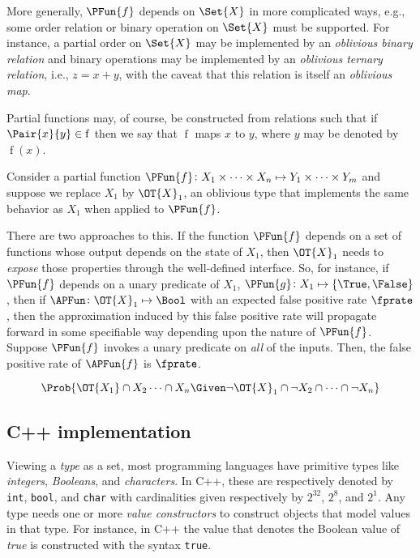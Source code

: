\documentclass[ ../main.tex]{subfiles}
\begin{document}
	More generally, $\PFun{f}$ depends on $\Set{X}$ in more complicated ways, e.g., some order relation or binary operation on $\Set{X}$ must be supported.
	For instance, a partial order on $\Set{X}$ may be implemented by an \emph{oblivious binary relation} and binary operations may be implemented by an \emph{oblivious ternary relation}, i.e., $z=x+y$, with the caveat that this relation is itself an \emph{oblivious map}.
	
	Partial functions may, of course, be constructed from relations such that if $\Pair{x}{y} \in \operatorname{f}$ then we say that $\operatorname{f}$ maps $x$ to $y$, where $y$ may be denoted by $\operatorname{f}(x)$.
	
Consider a partial function $\PFun{f} \colon X_1 \times \cdots \times X_n \mapsto Y_1 \times \cdots \times Y_m$ and suppose we replace $X_1$ by $\OT{X}_1$, an oblivious type that implements the same behavior as $X_1$ when applied to $\PFun{f}$.
	
	There are two approaches to this.
	If the function $\PFun{f}$ depends on a set of functions whose output depends on the state of $X_1$, then $\OT{X}_1$ needs to \emph{expose} those properties through the well-defined interface.
	So, for instance, if $\PFun{f}$ depends on a unary predicate of $X_1$, $\PFun{g} \colon X_1 \mapsto \{\True,\False\}$, then if $\APFun \colon \OT{X}_1 \mapsto \Bool$ with an expected false positive rate $\fprate$, then the approximation induced by this false positive rate will propagate forward in some specifiable way depending upon the nature of $\PFun{f}$. Suppose $\PFun{f}$ invokes a unary predicate on \emph{all} of the inputs. Then, the false positive rate of $\APFun{f}$ is $\fprate$.
	
	\begin{equation}
	\Prob{\OT{X_1} \cap X_2 \cdots \cap X_n \Given \neg \OT{X}_1 \cap \neg X_2 \cap \cdots \cap \neg X_n}
	\end{equation}

\subsection{C++ implementation}
	Viewing a \emph{type} as a set, most programming languages have primitive types like \emph{integers}, \emph{Booleans}, and \emph{characters}.
	In C++, these are respectively denoted by \texttt{int}, \texttt{bool}, and \texttt{char} with cardinalities given respectively by $2^{32}$, $2^8$, and $2^1$.
	Any type needs one or more \emph{value constructors} to construct objects that model values in that type.
	For instance, in C++ the value that denotes the Boolean value of \emph{true} is constructed with the syntax \texttt{true}.
	
\end{document}
